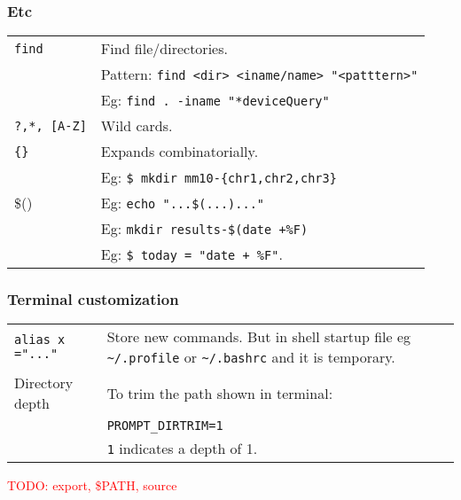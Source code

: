 \vfill\null
\columnbreak


\subsubsection{Etc}

\begin{tabularx}{\linewidth}{lX}
    \texttt{find}           & Find file/directories.\\
                            & Pattern: \texttt{find <dir> <iname/name> "<patttern>"}\\
                            & Eg: \texttt{find . -iname "*deviceQuery"}\\
    \hline
    
    \texttt{?,*, [A-Z]} & Wild cards.\\
    \texttt{\{\}} & Expands combinatorially.\\ 
    &  Eg: \texttt{\$ mkdir mm10-\{chr1,chr2,chr3\}}\\
    \$() & Eg: \texttt{echo "...\$(...)..."}\\
    & Eg: \texttt{mkdir results-\$(date +\%F)}\\
    & Eg: \texttt{\$ today = "date + \%F"}. \\
    \hline

\end{tabularx}


\subsubsection{Terminal customization}

\begin{tabularx}{\linewidth}{lX}
    \texttt{alias x ="..."}             & Store new commands. But in shell startup file eg \texttt{\~{}/.profile} or \texttt{\~{}/.bashrc} and it is temporary.\\
    Directory depth                     & To trim the path shown in terminal:\\
                                        & \texttt{PROMPT\_DIRTRIM=1}\\
                                        & \texttt{1} indicates a depth of 1.\\
\end{tabularx}

\textcolor{red}{TODO: export, \$PATH, source}


\vfill\null
\columnbreak